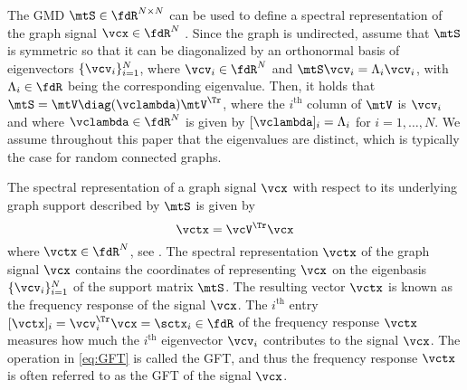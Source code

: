 

The GMD $\mtS \in \fdR^{N \times N}$ can be used to define a spectral representation of the graph signal $\vcx \in \fdR^{N}$ \cite{Sandryhaila2014-DSPGfreq}. Since the graph is undirected, assume that $\mtS$ is symmetric so that it can be diagonalized by an orthonormal basis of eigenvectors $\{\vcv_{i}\}_{i=1}^N$, where $\vcv_{i} \in \fdR^{N}$ and $\mtS \vcv_{i} = \lambda_{i} \vcv_{i}$, with $\lambda_{i} \in \fdR$ being the corresponding eigenvalue. Then, it holds that $\mtS = \mtV \diag(\vclambda) \mtV^{\Tr}$, where the $i^{\text{th}}$ column of $\mtV$ is $\vcv_{i}$ and where $\vclambda \in \fdR^{N}$ is given by $[\vclambda]_{i} = \lambda_{i}$ for $i=1,\ldots,N$. We assume throughout this paper that the eigenvalues are distinct, which is typically the case for random connected graphs.

The spectral representation of a graph signal $\vcx$ with respect to its underlying graph support described by $\mtS$ is given by
\begin{equation} \label{eq:GFT}
    \vctx = \vcV^{\Tr} \vcx
\end{equation}
%
where $\vctx \in \fdR^{N}$, see \cite{Sandryhaila2014-DSPGfreq}. The spectral representation $\vctx$ of the graph signal $\vcx$ contains the coordinates of representing $\vcx$ on the eigenbasis $\{\vcv_{i}\}_{i=1}^N$ of the support matrix $\mtS$. The resulting vector $\vctx$ is known as the frequency response of the signal $\vcx$. The $i^{\text{th}}$ entry $[\vctx]_{i} = \vcv_{i}^{\Tr} \vcx = \sctx_{i} \in \fdR$ of the frequency response $\vctx$ measures how much the $i^{\text{th}}$ eigenvector $\vcv_{i}$ contributes to the signal $\vcx$. The operation in \eqref{eq:GFT} is called the GFT, and thus the frequency response $\vctx$ is often referred to as the GFT of the signal $\vcx$.

